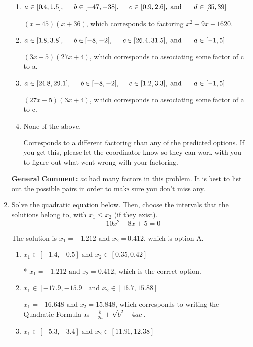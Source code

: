 \documentclass{extbook}[14pt]
\newcommand{\litem}[1]{\item #1

\rule{\textwidth}{0.4pt}}
\begin{document}
\begin{enumerate}
{\begin{enumerate}[label=\Alph*.]
* $(9x -5)(9x + 4)$, which is the correct option.
\item \( a \in [0.4, 1.5], \hspace*{5mm} b \in [-47, -38], \hspace*{5mm} c \in [0.9, 2.6], \text{ and } \hspace*{5mm} d \in [35, 39] \)

 $(x -45)(x + 36)$, which corresponds to factoring $x^{2} -9 x -1620$.
\item \( a \in [1.8, 3.8], \hspace*{5mm} b \in [-8, -2], \hspace*{5mm} c \in [26.4, 31.5], \text{ and } \hspace*{5mm} d \in [-1, 5] \)

 $(3x -5)(27x + 4)$, which corresponds to associating some factor of c to a.
\item \( a \in [24.8, 29.1], \hspace*{5mm} b \in [-8, -2], \hspace*{5mm} c \in [1.2, 3.3], \text{ and } \hspace*{5mm} d \in [-1, 5] \)

 $(27x -5)(3x + 4)$, which corresponds to associating some factor of a to c.
\item \( \text{None of the above.} \)

 Corresponds to a different factoring than any of the predicted options. If you get this, please let the coordinator know so they can work with you to figure out what went wrong with your factoring.
\end{enumerate}

\textbf{General Comment:} $ac$ had many factors in this problem. It is best to list out the possible pairs in order to make sure you don't miss any.
}
\litem{
Solve the quadratic equation below. Then, choose the intervals that the solutions belong to, with $x_1 \leq x_2$ (if they exist).
\[ -10x^{2} -8 x + 5 = 0 \]

The solution is \( x_1 = -1.212 \text{ and } x_2 = 0.412 \), which is option A.\begin{enumerate}[label=\Alph*.]
\item \( x_1 \in [-1.4, -0.5] \text{ and } x_2 \in [0.35, 0.42] \)

* $x_1 = -1.212 \text{ and } x_2 = 0.412$, which is the correct option.
\item \( x_1 \in [-17.9, -15.9] \text{ and } x_2 \in [15.7, 15.88] \)

 $x_1 = -16.648 \text{ and } x_2 = 15.848$, which corresponds to writing the Quadratic Formula as $-\frac{b}{2a} \pm \sqrt{b^2 - 4ac}$.
\item \( x_1 \in [-5.3, -3.4] \text{ and } x_2 \in [11.91, 12.38] \)


\end{enumerate}}
\end{enumerate}
\end{document}
